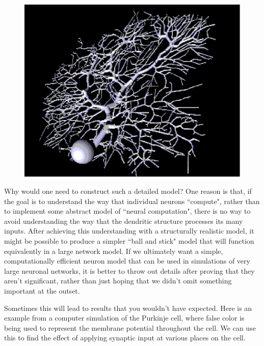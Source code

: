 \documentclass[12pt]{article}
\begin{document}
\begin{figure}[h]
  \centering
 \includegraphics[scale=0.5]{figures/purkcell.eps}
  \label{fig:purkcell}
\end{figure}

Why would one need to construct such a detailed model? One reason is that, if the goal is to understand the way that individual neurons ``compute", rather than to implement some abstract model of ``neural computation", there is no way to avoid understanding the way that the dendritic structure processes its many inputs. After achieving this understanding with a structurally realistic model, it might be possible to produce a simpler ``ball and stick" model that will function equivalently in a large network model. If we ultimately want a simple, computationally efficient neuron model that can be used in simulations of very large neuronal networks, it is better to throw out details after proving that they aren't significant, rather than just hoping that we didn't omit something important at the outset. 

Sometimes this will lead to results that you wouldn't have expected. Here is an example from a computer simulation of the Purkinje cell, where false color is being used to represent the membrane potential throughout the cell. We can use this to find the effect of applying synaptic input at various places on the cell.
\end{document}
